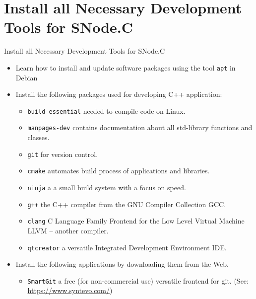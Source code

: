 \section{Install all Necessary Development Tools for SNode.C}

\begin{frame}{Install all Necessary Development Tools for SNode.C}
  \begin{itemize}
    \item Learn how to install and update software packages using the tool \alert{\texttt{apt}} in Debian
    \item Install the following packages used for developing C++ application:
    \begin{itemize}
      \item \textcolor{fh-ooe-red}{\texttt{build-essential}} needed to compile code on Linux.
      \item \textcolor{fh-ooe-red}{\texttt{manpages-dev}} contains documentation about all std-library functions and classes.
      \item \textcolor{fh-ooe-red}{\texttt{git}} for version control.
      \item \textcolor{fh-ooe-red}{\texttt{cmake}} automates build process of applications and libraries.
      \item \textcolor{fh-ooe-red}{\texttt{ninja}} a a small build system with a focus on speed.
      \item \textcolor{fh-ooe-red}{\texttt{g++}} the C++ compiler from the \textcolor{fh-ooe-red}{G}NU \textcolor{fh-ooe-red}{C}ompiler \textcolor{fh-ooe-red}{C}ollection \textcolor{fh-ooe-red}{GCC}.
      \item \textcolor{fh-ooe-red}{\texttt{clang}} \textcolor{fh-ooe-red}{C} \textcolor{fh-ooe-red}{L}anguage \textcolor{fh-ooe-red}{F}amily \textcolor{fh-ooe-red}{F}rontend for the \textcolor{fh-ooe-red}{L}ow \textcolor{fh-ooe-red}{L}evel \textcolor{fh-ooe-red}{V}irtual \textcolor{fh-ooe-red}{M}achine \textcolor{fh-ooe-red}{LLVM} -- another compiler.
      \item \textcolor{fh-ooe-red}{\texttt{qtcreator}} a versatile \textcolor{fh-ooe-red}{I}ntegrated \textcolor{fh-ooe-red}{D}evelopment \textcolor{fh-ooe-red}{E}nvironment \textcolor{fh-ooe-red}{IDE}.
    \end{itemize}
    \item Install the following applications by downloading them from the Web.
    \begin{itemize}
      \item \textcolor{fh-ooe-red}{\texttt{SmartGit}} a free (for non-commercial use) versatile frontend for git. (See: \textcolor{fh-ooe-red}{\href{https://www.syntevo.com/}{https://www.syntevo.com/}})
    \end{itemize}
  \end{itemize}
\end{frame}
